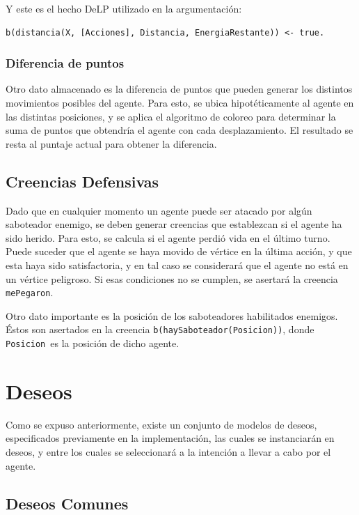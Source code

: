 \documentclass[oneside]{book}
\theoremstyle{definition}
\theoremstyle{example}
\begin{document}
Y este es el hecho DeLP utilizado en la argumentación:

\begin{verbatim}
b(distancia(X, [Acciones], Distancia, EnergiaRestante)) <- true.
\end{verbatim}

\subsubsection{Diferencia de puntos}

Otro dato almacenado es la diferencia de puntos que pueden generar los distintos
movimientos posibles del agente. Para esto, se ubica hipotéticamente al agente
en las distintas posiciones, y se aplica el algoritmo de coloreo para determinar
la suma de puntos que obtendría el agente con cada desplazamiento. El resultado
se resta al puntaje actual para obtener la diferencia.

\subsection{Creencias Defensivas}

Dado que en cualquier momento un agente puede ser atacado por algún saboteador 
enemigo, se deben generar creencias que establezcan si el agente ha sido herido.
Para esto, se calcula si el agente perdió vida en el último turno. Puede suceder
que el agente se haya movido de vértice en la última acción, y que esta haya sido
satisfactoria, y en tal caso se considerará que el agente no está en un vértice
peligroso. Si esas condiciones no se cumplen, se asertará la creencia 
\texttt{mePegaron}.

Otro dato importante es la posición de los saboteadores habilitados enemigos.
Éstos son asertados en la creencia \texttt{b(haySaboteador(Posicion))}, donde 
\texttt{Posicion}\ es la posición de dicho agente.

\section{Deseos}

Como se expuso anteriormente, existe un conjunto de modelos de deseos, especificados
previamente en la implementación, las cuales se instanciarán en deseos, y entre los 
cuales se seleccionará a la intención a llevar a cabo por el agente.

\subsection{Deseos Comunes}
\end{document}
